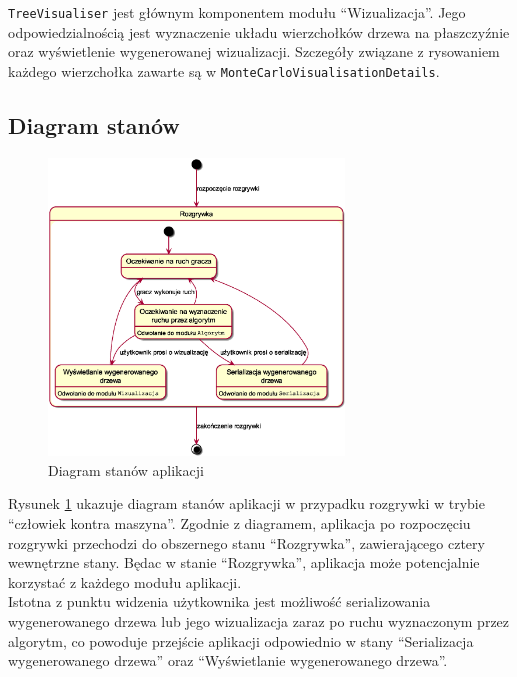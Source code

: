 \documentclass{article}
\newcommand{\code}[1]{\colorbox{light-gray}{\texttt{#1}}}
\begin{document}
	\noindent \code{TreeVisualiser} jest głównym komponentem modułu ``Wizualizacja''. Jego odpowiedzialnością jest wyznaczenie układu wierzchołków drzewa na płaszczyźnie oraz wyświetlenie wygenerowanej wizualizacji. Szczegóły związane z rysowaniem każdego wierzchołka zawarte są w \code{MonteCarloVisualisationDetails}.
	
	\clearpage
	\subsection{Diagram stanów}
	\begin{figure}[h]
		\centering
		\includegraphics[width=0.7\textwidth]{statediagram}
		\caption{Diagram stanów aplikacji}
		\label{rys:statediagram}
	\end{figure}

	\noindent Rysunek \ref{rys:statediagram} ukazuje diagram stanów aplikacji w przypadku rozgrywki w trybie ``człowiek kontra maszyna''. Zgodnie z diagramem, aplikacja po rozpoczęciu rozgrywki przechodzi do obszernego stanu ``Rozgrywka'', zawierającego cztery wewnętrzne stany. Będac w stanie ``Rozgrywka'', aplikacja może potencjalnie korzystać z każdego modułu aplikacji. \\
	
	\noindent Istotna z punktu widzenia użytkownika jest możliwość serializowania wygenerowanego drzewa lub jego wizualizacja zaraz po ruchu wyznaczonym przez algorytm, co powoduje przejście aplikacji odpowiednio w stany ``Serializacja wygenerowanego drzewa'' oraz ``Wyświetlanie wygenerowanego drzewa''.
	\clearpage
	
\end{document}
